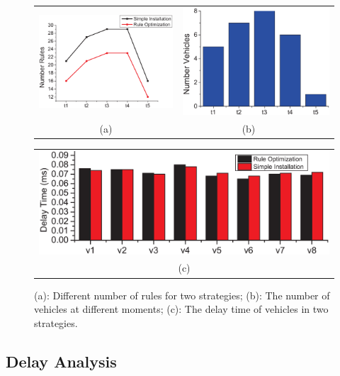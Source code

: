 \documentclass[journal]{IEEEtran}
\begin{document}
\begin{figure} [t]
\begin{center}
\begin{tabular}{cc}
\includegraphics[width=0.5\columnwidth]{fig-e-num-1.eps}&
\hspace {-0.2in}
\includegraphics[width=0.5\columnwidth]{fig-e-num-2.eps} \\
(a) & (b)~~~
\end{tabular}
\begin{tabular}{c}
\includegraphics[width=0.9\columnwidth]{fig-e-8bar-30.eps} \\
(c)
\end{tabular}
\caption{(a): Different number of rules for two strategies; (b): The number of vehicles at different moments; (c): The delay time of vehicles in two strategies.} \label{fig8b}
  \end{center}
  \vspace{-0.35in}
\end{figure}

\subsection{Delay Analysis}
\end{document}
